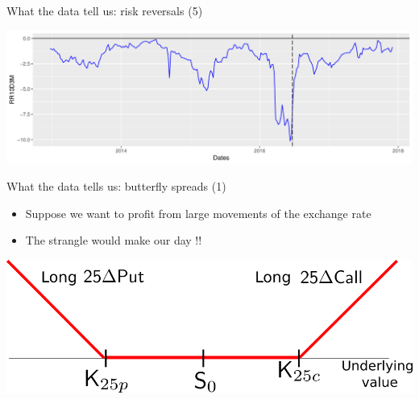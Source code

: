 \begin{frame}[fragile]{What the data tell us: risk reversals (5)}

\begin{Shaded}
\begin{Highlighting}[]
\StringTok{ }\OperatorTok{+}\StringTok{ }\NormalTok{(}\NormalTok{) }\OperatorTok{+}\StringTok{ }
\StringTok{        }\NormalTok{(}\NormalTok{)}
\StringTok{ }\OperatorTok{+}\StringTok{ }\NormalTok{(}\NormalTok{(}\NormalTok{((}\NormalTok{))),}
                     \NormalTok{)}
\end{Highlighting}
\end{Shaded}

\includegraphics[width=1\linewidth]{2018_02_07_IMF_FXCourse_files/figure-beamer/unnamed-chunk-15-1}

\end{frame}

\begin{frame}{What the data tells us: butterfly spreads (1)}

\begin{itemize}
\tightlist
\item
  Suppose we want to profit from large movements of the exchange rate
\item
  The strangle would make our day !!
\end{itemize}

\begin{center}\includegraphics[width=0.7\linewidth]{images/fig25BFSimple} \end{center}

\end{frame}

